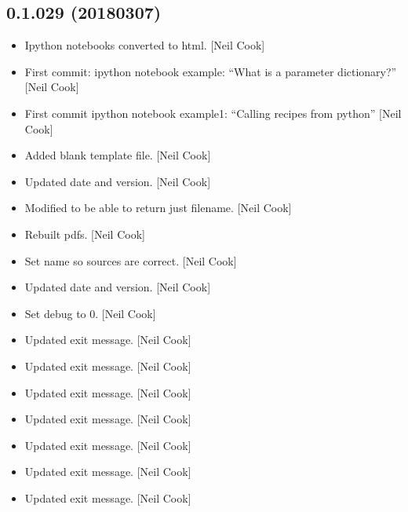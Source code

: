 \documentclass[a4paper,10pt,english]{report}
\begin{document}
\subsection{0.1.029 (2018\sphinxhyphen{}03\sphinxhyphen{}07)}
\label{\detokenize{misc/changelog:id493}}\begin{itemize}
\item {} 
Ipython notebooks converted to html. {[}Neil Cook{]}

\item {} 
First commit: ipython notebook example: “What is a parameter
dictionary?” {[}Neil Cook{]}

\item {} 
First commit ipython notebook example1: “Calling recipes from python”
{[}Neil Cook{]}

\item {} 
Added blank template file. {[}Neil Cook{]}

\item {} 
Updated date and version. {[}Neil Cook{]}

\item {} 
Modified  to be able to return just filename. {[}Neil
Cook{]}

\item {} 
Rebuilt pdfs. {[}Neil Cook{]}

\item {} 
Set  name so sources are correct. {[}Neil Cook{]}

\item {} 
Updated date and version. {[}Neil Cook{]}

\item {} 
Set debug to 0. {[}Neil Cook{]}

\item {} 
Updated exit message. {[}Neil Cook{]}

\item {} 
Updated exit message. {[}Neil Cook{]}

\item {} 
Updated exit message. {[}Neil Cook{]}

\item {} 
Updated exit message. {[}Neil Cook{]}

\item {} 
Updated exit message. {[}Neil Cook{]}

\item {} 
Updated exit message. {[}Neil Cook{]}

\item {} 
Updated exit message. {[}Neil Cook{]}


\end{itemize}
\end{document}

